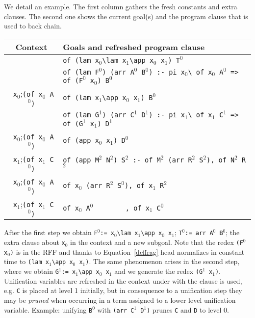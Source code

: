 \documentclass{llncs}
\begin{document}
We detail an example.
The first column gathers the fresh constants and extra clauses. The
second one shows the current goal(s) and the program clause that is
used to back chain.

\begin{center}
\small
\begin{tabular}{c|l}
Context & Goals and refreshed program clause \\\hline
& \verb+of (lam x+$_0$\verb+\lam x+$_1$\verb+\app x+$_0$\verb+ x+$_1$\verb+) T+$^0$  \\
& \verb+of (lam F+$^0$\verb+) (arr A+$^0$\verb+ B+$^0$\verb+) :- pi x+$_0$\verb+\ of x+$_0$\verb+ A+$^0$\verb+ => of (F+$^0$\verb+ x+$_0$\verb+) B+$^0$ \\\hline
\verb+ x+$_0$;\verb+(of x+$_0$\verb+ A+$^0$\verb+)+ & \verb+of (lam x+$_1$\verb+\app x+$_0$\verb+ x+$_1$\verb+) B+$^0$  \\
& \verb+of (lam G+$^1$\verb+) (arr C+$^1$\verb+ D+$^1$\verb+) :- pi x+$_1$\verb+\ of x+$_1$\verb+ C+$^1$\verb+ => of (G+$^1$\verb+ x+$_1$\verb+) D+$^1$\verb++  \\\hline
\verb+ x+$_0$;\verb+(of x+$_0$\verb+ A+$^0$\verb+)+ & \verb+of (app x+$_0$\verb+ x+$_1$\verb+) D+$^0$  \\
\verb+ x+$_1$;\verb+(of x+$_1$\verb+ C+$^0$\verb+)+ & \verb+of (app M+$^2$\verb+ N+$^2$\verb+) S+$^2$\verb+ :- of M+$^2$\verb+ (arr R+$^2$\verb+ S+$^2$\verb+), of N+$^2$\verb+ R+$^2$  \\\hline
\verb+ x+$_0$;\verb+(of x+$_0$\verb+ A+$^0$\verb+)+ & \verb+of x+$_0$\verb+ (arr R+$^2$\verb+ S+$^0$\verb+), of x+$_1$\verb+ R+$^2$  \\
\verb+ x+$_1$;\verb+(of x+$_1$\verb+ C+$^0$\verb+)+ & \verb+of x+$_0$\verb+ A+$^0$\hspace{4pt}\verb+        , of x+$_1$\verb+ C+$^0$ \\\hline
\end{tabular}
\end{center}

After the first step we obtain
\verb+F+$^0$\verb+:= x+$_0$\verb+\lam x+$_1$\verb+\app x+$_0$\verb+ x+$_1$;
\verb+T+$^0$\verb+:= arr A+$^0$\verb+ B+$^0$; the extra clause
about \verb+x+$_0$ in the context and a new subgoal.
Note that the redex \verb+(F+$^0$\verb+ x+$_0$\verb+)+ is in the RFF and
thanks to Equation~\ref{deffrag} head normalizes in constant time
to \verb+(lam x+$_1$\verb+\app x+$_0$\verb+ x+$_1$\verb+)+.
The same phenomenon arises in the second step,
where we obtain \verb+G+$^1$\verb+:= x+$_1$\verb+\app x+$_0$\verb+ x+$_1$
and we generate the redex \verb+(G+$^1$\verb+ x+$_1$\verb+)+.
Unification variables are refreshed in the context under with
the clause is used, e.g. \verb+C+ is placed at level 1 initially,
but in consequence to a unification step they may be \emph{pruned}
when occurring in a term assigned to a lower level unification
variable. Example:  unifying 
\verb+B+$^0$ with \verb+(arr C+$^1$\verb+ D+$^1$\verb+)+ prunes
\verb+C+ and \verb+D+ to level 0.
\end{document}
